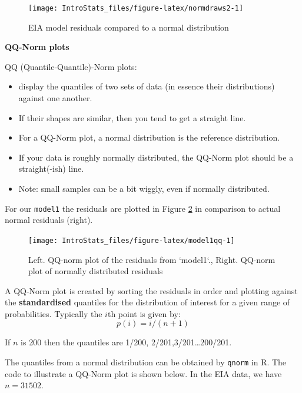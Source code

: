 \documentclass[
  oneside]{krantz}
\providecommand{\tightlist}{%
  \setlength{\itemsep}{0pt}\setlength{\parskip}{0pt}}
\begin{document}
\begin{figure}

{\centering \texttt{[image: IntroStats\_files/figure-latex/normdraws2-1]} 

}

\caption{EIA model residuals compared to a normal distribution}\label{fig:normdraws2}
\end{figure}

\textbf{QQ-Norm plots}

QQ (Quantile-Quantile)-Norm plots:

\begin{itemize}
\tightlist
\item
  display the quantiles of two sets of data (in essence their distributions) against one another.
\item
  If their shapes are similar, then you tend to get a straight line.
\item
  For a QQ-Norm plot, a normal distribution is the reference distribution.
\item
  If your data is roughly normally distributed, the QQ-Norm plot should be a straight(-ish) line.
\item
  Note: small samples can be a bit wiggly, even if normally distributed.
\end{itemize}

For our \texttt{model1} the residuals are plotted in Figure \ref{fig:model1qq} in comparison to actual normal residuals (right).

\begin{figure}

{\centering \texttt{[image: IntroStats\_files/figure-latex/model1qq-1]} 

}

\caption{Left. QQ-norm plot of the residuals from `model1`., Right. QQ-norm plot of normally distributed residuals}\label{fig:model1qq}
\end{figure}

A QQ-Norm plot is created by sorting the residuals in order and plotting against the \textbf{standardised} quantiles for the distribution of interest for a given range of probabilities. Typically the \(i\)th point is given by:
\[p(i) = i/(n+1)\]

If \(n\) is 200 then the quantiles are 1/200, 2/201,3/201\ldots200/201.

The quantiles from a normal distribution can be obtained by \texttt{qnorm} in R. The code to illustrate a QQ-Norm plot is shown below. In the EIA data, we have \(n = 31502\).
\end{document}
